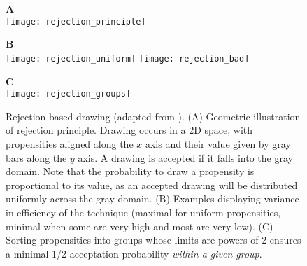 \begin{figure}[!h]
  \centering
  \begin{minipage}{0.59\textwidth}
    \textbf{A} \\
    \texttt{[image: rejection\_principle]}
  \end{minipage}
  \begin{minipage}{0.39\textwidth}
    \textbf{B} \\
    \texttt{[image: rejection\_uniform]}
    \texttt{[image: rejection\_bad]}
  \end{minipage}
  \begin{minipage}{0.6\textwidth}
    \textbf{C}\\
    \texttt{[image: rejection\_groups]}  
  \end{minipage}
  \caption{Rejection based drawing (adapted from \citet{slepoy_constant-time_2008}). (A) Geometric illustration of rejection principle. Drawing occurs in a 2D space, with propensities aligned along the $x$ axis and their value given by gray bars along the $y$ axis. A drawing is accepted if it falls into the gray domain. Note that the probability to draw a propensity is proportional to its value, as an accepted drawing will be distributed uniformly across the gray domain. (B) Examples displaying variance in efficiency of the technique (maximal for uniform propensities, minimal when some are very high and most are very low). (C) Sorting propensities into groups whose limits are powers of 2 ensures a minimal 1/2 acceptation probability \emph{within a given group}.}
  \label{fig:rejection_based_drawing}
\end {figure}

